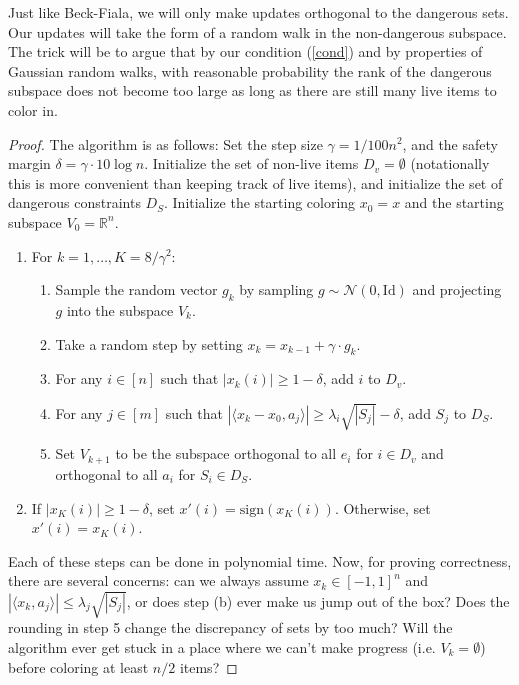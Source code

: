 \documentclass{article}
\theoremstyle{theorem}
\theoremstyle{definition}
\newcommand{\sgn}{\mathrm{sign}}
\newcommand{\R}{\mathbb{R}}
\newcommand{\iprod}[1]{\langle #1 \rangle}
\newcommand{\cN}{\mathcal{N}}
\newcommand{\Id}{\mathrm{Id}}
\begin{document}
\begin{remark}
Just like Beck-Fiala, we will only make updates orthogonal to the dangerous sets.
Our updates will take the form of a random walk in the non-dangerous subspace.
The trick will be to argue that by our condition (\ref{cond}) and by properties of Gaussian random walks, with reasonable probability the rank of the dangerous subspace does not become too large as long as there are still many live items to color in.
\begin{proof}
The algorithm is as follows:
    Set the step size $\gamma = 1/100n^2$, and the safety margin $\delta = \gamma \cdot 10\log n$.
    Initialize the set of non-live items $D_v = \emptyset $ (notationally this is more convenient than keeping track of live items), and initialize the set of dangerous constraints $D_S$.
    Initialize the starting coloring $x_0 = x$ and the starting subspace $V_0 = \R^n$.
\begin{enumerate}
    \item For $k = 1,\ldots, K= 8/\gamma^2$:
    \begin{enumerate}
	\item Sample the random vector $g_k$ by sampling $g \sim \cN(0, \Id)$ and projecting $g$ into the subspace $V_k$.
	\item Take a random step by setting $x_k = x_{k-1} + \gamma \cdot g_k$.
	\item For any $i \in [n]$ such that $|x_k(i)| \ge 1 - \delta$,  add $i$ to $D_v$.
	\item For any $j \in [m]$ such that $|\langle x_k - x_0, a_j\rangle| \ge \lambda_i\sqrt{|S_j|} - \delta$, add $S_j$ to $D_S$.
	\item Set $V_{k+1}$ to be the subspace orthogonal to all $e_i$ for $i \in D_v$ and orthogonal to all $a_i$ for $S_i \in D_S$.
    \end{enumerate}
\item If $|x_K(i)| \ge 1-\delta$, set $x'(i) = \sgn(x_K(i))$.
    Otherwise, set $x'(i) = x_K(i)$.
\end{enumerate}

Each of these steps can be done in polynomial time.
    Now, for proving correctness, there are several concerns: can we always assume $x_k \in [-1,1]^n$ and $|\iprod{x_k,a_j}|\le \lambda_j\sqrt{|S_j|}$, or does step (b) ever make us jump out of the box?
Does the rounding in step 5 change the discrepancy of sets by too much?
Will the algorithm ever get stuck in a place where we can't make progress (i.e. $V_k = \emptyset$) before coloring at least $n/2$ items?


\end{proof}
\end{remark}
\end{document}
